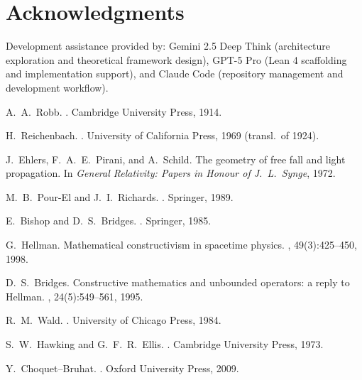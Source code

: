 \documentclass[11pt]{article}
\theoremstyle{definition}
\theoremstyle{remark}
\begin{document}
\section*{Acknowledgments}
Development assistance provided by: Gemini 2.5 Deep Think (architecture exploration and theoretical framework design), GPT-5 Pro (Lean 4 scaffolding and implementation support), and Claude Code (repository management and development workflow).

\begin{thebibliography}{99}

A.~A.~Robb.
.
\newblock Cambridge University Press, 1914.

H.~Reichenbach.
.
\newblock University of California Press, 1969 (transl.\ of 1924).

J.~Ehlers, F.~A.~E.~Pirani, and A.~Schild.
\newblock The geometry of free fall and light propagation.
\newblock In {\em General Relativity: Papers in Honour of J.~L.~Synge}, 1972.

M.~B.~Pour-El and J.~I.~Richards.
.
\newblock Springer, 1989.

E.~Bishop and D.~S.~Bridges.
.
\newblock Springer, 1985.

G.~Hellman.
\newblock Mathematical constructivism in spacetime physics.
, 49(3):425--450, 1998.

D.~S.~Bridges.
\newblock Constructive mathematics and unbounded operators: a reply to Hellman.
, 24(5):549--561, 1995.

R.~M.~Wald.
.
\newblock University of Chicago Press, 1984.

S.~W.~Hawking and G.~F.~R.~Ellis.
.
\newblock Cambridge University Press, 1973.

Y.~Choquet--Bruhat.
.
\newblock Oxford University Press, 2009.

\end{thebibliography}
\appendix
\end{document}
